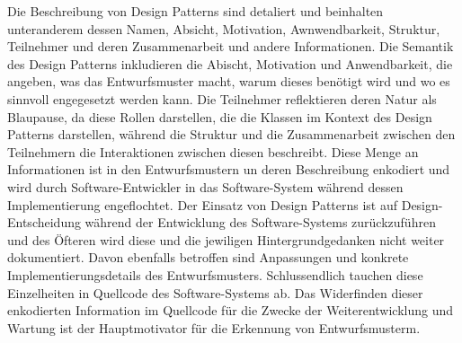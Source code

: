 Die Beschreibung von Design Patterns sind detaliert und beinhalten unteranderem dessen Namen, Absicht, Motivation, Awnwendbarkeit, Struktur, Teilnehmer und deren Zusammenarbeit und andere Informationen. Die Semantik des Design Patterns inkludieren die Abischt, Motivation und Anwendbarkeit,
die angeben, was das Entwurfsmuster macht, warum dieses benötigt wird und wo es sinnvoll engegesetzt werden kann. Die Teilnehmer reflektieren deren Natur als Blaupause, da diese Rollen darstellen, die die Klassen im Kontext des Design Patterns darstellen, während die Struktur und die Zusammenarbeit zwischen den Teilnehmern die Interaktionen zwischen diesen beschreibt.
Diese Menge an Informationen ist in den Entwurfsmustern un deren Beschreibung enkodiert und wird durch Software-Entwickler in das Software-System während dessen Implementierung engeflochtet. Der Einsatz von Design Patterns ist auf Design-Entscheidung während der Entwicklung des Software-Systems zurückzuführen und des Öfteren wird diese und die jewiligen Hintergrundgedanken nicht weiter dokumentiert.
Davon ebenfalls betroffen sind Anpassungen und konkrete Implementierungsdetails des Entwurfsmusters. Schlussendlich tauchen diese Einzelheiten in Quellcode des Software-Systems ab. Das Widerfinden dieser enkodierten Information im Quellcode für die Zwecke der Weiterentwicklung und Wartung ist der Hauptmotivator für die Erkennung von Entwurfsmusterm.